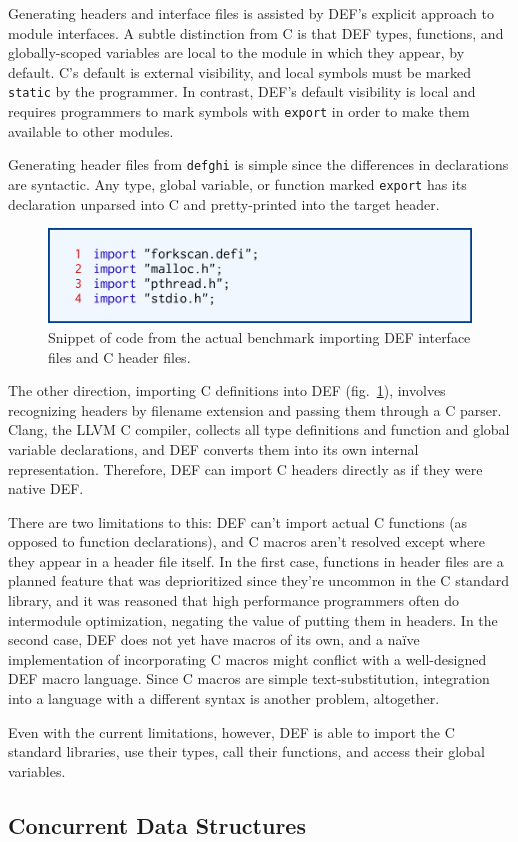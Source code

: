 Generating headers and interface files is assisted by DEF's explicit approach to module interfaces.  A subtle distinction from C is that DEF types, functions, and globally-scoped variables are local to the module in which they appear, by default.  C's default is external visibility, and local symbols must be marked \texttt{static} by the programmer.  In contrast, DEF's default visibility is local and requires programmers to mark symbols with \texttt{export} in order to make them available to other modules.

Generating header files from \texttt{defghi} is simple since the differences in declarations are syntactic.  Any type, global variable, or function marked \texttt{export} has its declaration unparsed into C and pretty-printed into the target header.

\begin{figure}[htbp!]
        \centering
        \includegraphics[scale=0.25]{gfx/import}
        \caption{Snippet of code from the actual benchmark importing DEF interface files and C header files.}
        \label{fig:import}
\end{figure}

The other direction, importing C definitions into DEF (fig.~\ref{fig:import}), involves recognizing headers by filename extension and passing them through a C parser.  Clang, the LLVM C compiler, collects all type definitions and function and global variable declarations, and DEF converts them into its own internal representation.  Therefore, DEF can import C headers directly as if they were native DEF.

There are two limitations to this: DEF can't import actual C functions (as opposed to function declarations), and C macros aren't resolved except where they appear in a header file itself.  In the first case, functions in header files are a planned feature that was deprioritized since they're uncommon in the C standard library, and it was reasoned that high performance programmers often do intermodule optimization, negating the value of putting them in headers.  In the second case, DEF does not yet have macros of its own, and a na\"ive implementation of incorporating C macros might conflict with a well-designed DEF macro language.  Since C macros are simple text-substitution, integration into a language with a different syntax is another problem, altogether.

Even with the current limitations, however, DEF is able to import the C standard libraries, use their types, call their functions, and access their global variables.

\subsection{Concurrent Data Structures}



